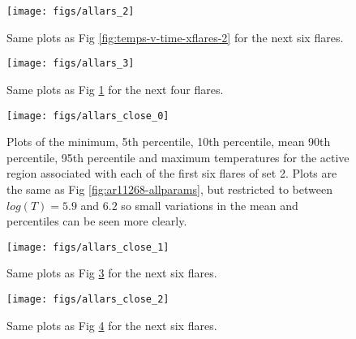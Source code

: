 \documentclass[namedreferences]{solarphysics}
\begin{document}
\begin{figure}
\begin{centering}
\texttt{[image: figs/allars\_2]} 
\par\end{centering}

\caption{Same plots as Fig \ref{fig:temps-v-time-xflares-2} for the next six flares.
\label{fig:temps-v-time-xflares-3}}
\end{figure}

\begin{figure}
\begin{centering}
\texttt{[image: figs/allars\_3]} 
\par\end{centering}

\caption{Same plots as Fig \ref{fig:temps-v-time-xflares-3} for the next four flares.\label{fig:temps-v-time-xflares-4}}
\end{figure}

\begin{figure}
\begin{centering}
\texttt{[image: figs/allars\_close\_0]} 
\par\end{centering}

\caption{Plots of the minimum, 5th percentile, 10th percentile, mean 90th percentile, 95th percentile and maximum temperatures for the active region associated with each of the first six flares of set 2.
Plots are the same as Fig \ref{fig:ar11268-allparams}, but restricted to between $log(T)=5.9$ and $6.2$ so small variations in the mean and percentiles can be seen more clearly.\label{fig:temps-v-time-xflares-1}}
\end{figure}

\begin{figure}
\begin{centering}
\texttt{[image: figs/allars\_close\_1]} 
\par\end{centering}

\caption{Same plots as Fig \ref{fig:temps-v-time-xflares-1} for the next six flares.
\label{fig:temps-v-time-xflares-1-1}}
\end{figure}


\begin{figure}
\begin{centering}
\texttt{[image: figs/allars\_close\_2]} 
\par\end{centering}

\caption{Same plots as Fig \ref{fig:temps-v-time-xflares-1-1} for the next six flares.\label{fig:temps-v-time-xflares-1-2}}
\end{figure}
\end{document}
